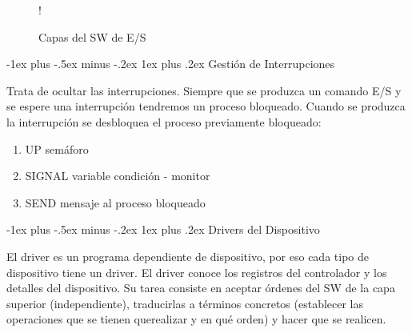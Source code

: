 \documentclass[10pt,portrait, twocolumn]{article}
\makeatletter
\renewcommand{\subsubsection}{\@startsection{subsubsection}{3}{0mm}%
                                {-1ex plus -.5ex minus -.2ex}%
                                {1ex plus .2ex}%
                                {\normalfont\small\bfseries}}
\makeatother
\begin{document}
\begin{figure}[h]
	\centering
		\resizebox {\columnwidth} {!} {

	}
      \caption{Capas del SW de E/S}
  \end{figure}
  
 \subsubsection{Gestión de Interrupciones}
 
 Trata de ocultar las interrupciones. Siempre que se produzca un comando E/S y se espere una interrupción tendremos un proceso bloqueado. Cuando se produzca la interrupción se desbloquea el proceso previamente bloqueado:
 
 	\begin{enumerate}
		\item UP semáforo
		\item SIGNAL variable condición - monitor
		\item SEND mensaje al proceso bloqueado
	\end{enumerate}

\subsubsection{Drivers del Dispositivo}

El driver es un programa dependiente de dispositivo, por eso cada tipo de dispositivo tiene un driver. El driver conoce los registros del controlador y los detalles del dispositivo. Su tarea consiste en aceptar órdenes del SW de la capa superior (independiente), traducirlas a términos concretos (establecer las operaciones que se tienen querealizar y en qué orden) y hacer que se realicen.
\end{document}
